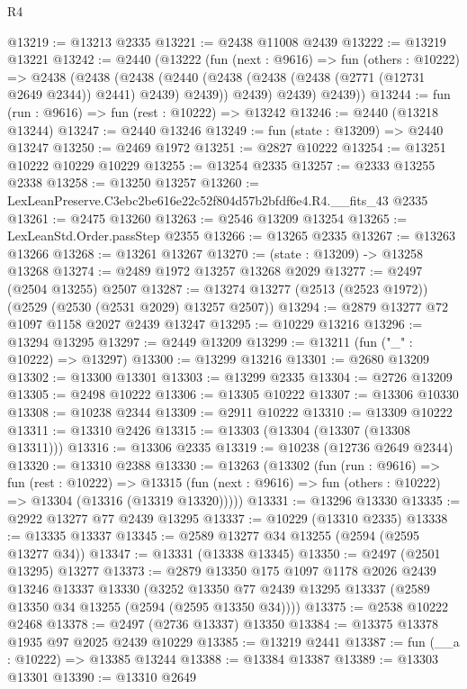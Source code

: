 \begin{lexlean}{R4}
\begin{coremodule}
@13219 := @13213 @2335
@13221 := @2438 @11008 @2439
@13222 := @13219 @13221
@13242 := @2440
    (@13222
      (fun (next : @9616) =>
      fun (others : @10222) =>
      @2438
        (@2438
          (@2438
            (@2440 (@2438 (@2438 (@2438 (@2771 (@12731 @2649 @2344)) @2441) @2439) @2439))
            @2439)
          @2439)
        @2439))
@13244 := fun (run : @9616) => fun (rest : @10222) => @13242
@13246 := @2440 (@13218 @13244)
@13247 := @2440 @13246
@13249 := fun (state : @13209) => @2440 @13247
@13250 := @2469 @1972
@13251 := @2827 @10222
@13254 := @13251 @10222 @10229 @10229
@13255 := @13254 @2335
@13257 := @2333 @13255 @2338
@13258 := @13250 @13257
@13260 := LexLeanPreserve.C3ebc2be616e22c52f804d57b2bfdf6e4.R4.__fits_43 @2335
@13261 := @2475 @13260
@13263 := @2546 @13209 @13254
@13265 := LexLeanStd.Order.passStep @2355
@13266 := @13265 @2335
@13267 := @13263 @13266
@13268 := @13261 @13267
@13270 := (state : @13209) -> @13258 @13268
@13274 := @2489 @1972 @13257 @13268 @2029
@13277 := @2497 (@2504 @13255) @2507
@13287 := @13274 @13277 (@2513 (@2523 @1972)) (@2529 (@2530 (@2531 @2029) @13257 @2507))
@13294 := @2879 @13277 @72 @1097 @1158 @2027 @2439 @13247
@13295 := @10229 @13216
@13296 := @13294 @13295
@13297 := @2449 @13209
@13299 := @13211 (fun ("_" : @10222) => @13297)
@13300 := @13299 @13216
@13301 := @2680 @13209
@13302 := @13300 @13301
@13303 := @13299 @2335
@13304 := @2726 @13209
@13305 := @2498 @10222
@13306 := @13305 @10222
@13307 := @13306 @10330
@13308 := @10238 @2344
@13309 := @2911 @10222
@13310 := @13309 @10222
@13311 := @13310 @2426
@13315 := @13303 (@13304 (@13307 (@13308 @13311)))
@13316 := @13306 @2335
@13319 := @10238 (@12736 @2649 @2344)
@13320 := @13310 @2388
@13330 := @13263
    (@13302
      (fun (run : @9616) =>
      fun (rest : @10222) =>
      @13315 (fun (next : @9616) => fun (others : @10222) => @13304 (@13316 (@13319 @13320)))))
@13331 := @13296 @13330
@13335 := @2922 @13277 @77 @2439 @13295
@13337 := @10229 (@13310 @2335)
@13338 := @13335 @13337
@13345 := @2589 @13277 @34 @13255 (@2594 (@2595 @13277 @34))
@13347 := @13331 (@13338 @13345)
@13350 := @2497 (@2501 @13295) @13277
@13373 := @2879
    @13350
    @175
    @1097
    @1178
    @2026
    @2439
    @13246
    @13337
    @13330
    (@3252 @13350 @77 @2439 @13295 @13337 (@2589 @13350 @34 @13255 (@2594 (@2595 @13350 @34))))
@13375 := @2538 @10222 @2468
@13378 := @2497 (@2736 @13337) @13350
@13384 := @13375 @13378 @1935 @97 @2025 @2439 @10229
@13385 := @13219 @2441
@13387 := fun (__a : @10222) => @13385 @13244
@13388 := @13384 @13387
@13389 := @13303 @13301
@13390 := @13310 @2649

\end{coremodule}
\end{lexlean}
